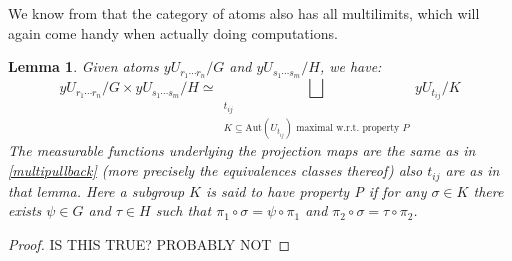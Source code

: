 \documentclass[a4paper]{amsproc}
\theoremstyle{plain}
\newtheorem{lemma}[theorem]{Lemma}
\theoremstyle{definition}
\theoremstyle{remark}
\numberwithin{equation}{section}
\begin{document}
We know from \cite{caramello_lafforgue} that the category of atoms also has all multilimits, which will again come handy when actually doing computations.
\begin{lemma} Given atoms $yU_{r_1\cdots r_n}/G$ and $yU_{s_1\cdots s_m}/H$, we have:
\[ yU_{r_1\cdots r_n}/G\times yU_{s_1\cdots s_m}/H\simeq \bigsqcup_{\substack{t_{ij}\\ K\subseteq \text{Aut}(U_{t_{ij}})\text{ maximal w.r.t. property }P}}yU_{t_{ij}}/K  \]
The measurable functions underlying the projection maps are the same as in \ref{multipullback} (more precisely the equivalences classes thereof) also $t_{ij}$ are as in that lemma.
Here a subgroup $K$ is said to have property P if for any $\sigma\in K$ there exists $\psi\in G$ and $\tau\in H$ such that $\pi_1\circ \sigma=\psi\circ \pi_1$ and $\pi_2\circ\sigma=\tau\circ \pi_2$.
\end{lemma}
\begin{proof}
IS THIS TRUE? PROBABLY NOT
\end{proof}

\end{document}
